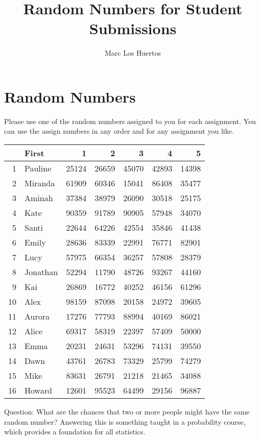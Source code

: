 \documentclass{article}\usepackage[]{graphicx}\usepackage[]{color}
\title{Random Numbers for Student Submissions}
\author{Marc Los Huertos}
\begin{document}
\maketitle


\section*{Random Numbers}

Please use one of the random numbers assigned to you for each assignment. You can use the assign numbers in any order and for any assignment you like. 

\begin{table}[ht]
\centering
\begin{tabular}{rlrrrrr}
  \hline
 & First & 1 & 2 & 3 & 4 & 5 \\ 
  \hline
1 & Pauline & 25124 & 26659 & 45070 & 42893 & 14398 \\ 
  2 & Miranda & 61909 & 60346 & 15041 & 86408 & 35477 \\ 
  3 & Aminah & 37384 & 38979 & 26090 & 30518 & 25175 \\ 
  4 & Kate & 90359 & 91789 & 90905 & 57948 & 34070 \\ 
  5 & Santi & 22644 & 64226 & 42554 & 35846 & 41438 \\ 
  6 & Emily & 28636 & 83339 & 22991 & 76771 & 82901 \\ 
  7 & Lucy & 57975 & 66354 & 36257 & 57808 & 28379 \\ 
  8 & Jonathan & 52294 & 11790 & 48726 & 93267 & 44160 \\ 
  9 & Kai & 26869 & 16772 & 40252 & 46156 & 61296 \\ 
  10 & Alex & 98159 & 87098 & 20158 & 24972 & 39605 \\ 
  11 & Aurora & 17276 & 77793 & 88994 & 40169 & 86021 \\ 
  12 & Alice & 69317 & 58319 & 22397 & 57409 & 50000 \\ 
  13 & Emma & 20231 & 24631 & 53296 & 74131 & 39550 \\ 
  14 & Dawn & 43761 & 26783 & 73329 & 25799 & 74279 \\ 
  15 & Mike & 83631 & 26791 & 21218 & 21465 & 34088 \\ 
  16 & Howard & 12601 & 95523 & 64499 & 29156 & 96887 \\ 
   \hline
\end{tabular}
\end{table}


Question: What are the chances that two or more people might have the same random number?  Answering this is something taught in a probability course, which provides a foundation for all statistics.
\end{document}
